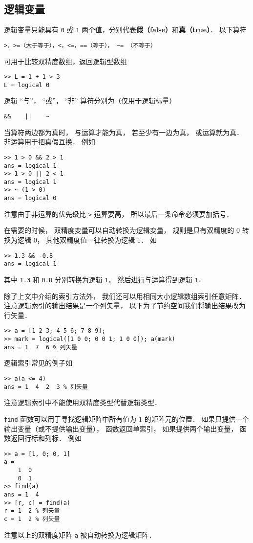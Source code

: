 \subsection{逻辑变量}

逻辑变量只能具有 \lstinline|0| 或 \lstinline|1| 两个值，分别代表\textbf{假（false）}和\textbf{真（true）}． 以下算符
\begin{lstlisting}[language=MatlabCom]
>，>=（大于等于），<，<=，==（等于）， ~= （不等于）
\end{lstlisting}
可用于比较双精度数组，返回逻辑型数组
\begin{lstlisting}[language=MatlabCom]
>> L = 1 + 1 > 3
L = logical 0
\end{lstlisting}

逻辑 “与”， “或”， “非” 算符分别为（仅用于逻辑标量）
\begin{lstlisting}[language=MatlabCom]
&&    ||    ~
\end{lstlisting}
当算符两边都为真时， 与运算才能为真， 若至少有一边为真， 或运算就为真． 非运算用于把真假互换． 例如
\begin{lstlisting}[language=MatlabCom]
>> 1 > 0 && 2 > 1
ans = logical 1
>> 1 > 0 || 2 < 1
ans = logical 1
>> ~ (1 > 0)
ans = logical 0
\end{lstlisting}
注意由于非运算的优先级比 \lstinline|>| 运算要高， 所以最后一条命令必须要加括号．

在需要的时候， 双精度变量可以自动转换为逻辑变量， 规则是只有双精度的 0 转换为逻辑 0， 其他双精度值一律转换为逻辑 1． 如
\begin{lstlisting}[language=MatlabCom]
>> 1.3 && -0.8
ans = logical 1
\end{lstlisting}
其中 \lstinline|1.3| 和 \lstinline|0.8| 分别转换为逻辑 \lstinline|1|， 然后进行与运算得到逻辑 \lstinline|1|．

除了上文中介绍的索引方法外， 我们还可以用相同大小逻辑数组索引任意矩阵． 注意逻辑索引的输出结果是一个列矢量， 以下为了节约空间我们将输出结果改为行矢量．
\begin{lstlisting}[language=MatlabCom]
>> a = [1 2 3; 4 5 6; 7 8 9];
>> mark = logical([1 0 0; 0 0 1; 1 0 0]); a(mark)
ans = 1  7  6 % 列矢量
\end{lstlisting}
逻辑索引常见的例子如
\begin{lstlisting}[language=MatlabCom]
>> a(a <= 4)
ans = 1  4  2  3 % 列矢量
\end{lstlisting}
注意逻辑索引中不能使用双精度类型代替逻辑类型．

\lstinline|find| 函数可以用于寻找逻辑矩阵中所有值为 1 的矩阵元的位置． 如果只提供一个输出变量（或不提供输出变量）， 函数返回单索引， 如果提供两个输出变量， 函数返回行标和列标． 例如
\begin{lstlisting}[language=MatlabCom]
>> a = [1, 0; 0, 1]
a =
    1  0
    0  1
>> find(a)
ans = 1  4
>> [r, c] = find(a)
r = 1  2 % 列矢量
c = 1  2 % 列矢量
\end{lstlisting}
注意以上的双精度矩阵 \lstinline|a| 被自动转换为逻辑矩阵． 


